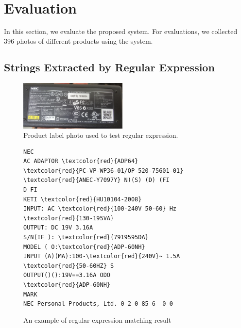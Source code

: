 \documentclass[technicalreport]{ieicej}
\begin{document}
\section{Evaluation}
\label{sec:evaluation}
    In this section, we evaluate the proposed system. For evaluations, we collected 396 photos of different products using the system.

    \subsection{Strings Extracted by Regular Expression}

        \begin{figure}[t] 
            \begin{center}
            \includegraphics[width=0.48\textwidth]{figure/label-regex-samp.png}
            \end{center}
            \caption{Product label photo used to test regular expression.}
            \label{fig:label-regex-samp}
        \end{figure}

        \begin{figure}[t] 
            \begin{center}
                \begin{BVerbatim}[commandchars=\\\{\}]
NEC
AC ADAPTOR \textcolor{red}{ADP64}
\textcolor{red}{PC-VP-WP36-01/OP-520-75601-01}
\textcolor{red}{ANEC-Y7097Y} N)(S) (D) (FI
D FI
KETI \textcolor{red}{HU10104-2008}
INPUT: AC \textcolor{red}{100-240V 50-60} Hz \textcolor{red}{130-195VA}
OUTPUT: DC 19V 3.16A
S/N(IF ): \textcolor{red}{7919595DA}
MODEL ( O:\textcolor{red}{ADP-60NH}
INPUT (A)(MA):100-\textcolor{red}{240V}~ 1.5A \textcolor{red}{50-60HZ} S
OUTPUT()():19V==3.16A ODO
\textcolor{red}{ADP-60NH}
MARK
NEC Personal Products, Ltd. 0 2 0 85 6 -0 0
                \end{BVerbatim}
            \end{center}
            \caption{An example of regular expression matching result}
            \label{fig:result-regex}
        \end{figure}
\end{document}
